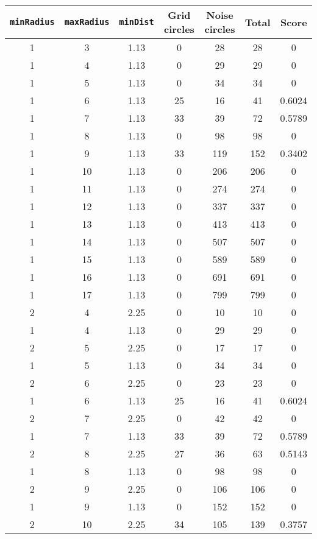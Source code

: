 \documentclass[letterpaper, 12pt]{article}
\begin{document}
\begin{longtable}{|c|c|c|c|c|c|c|}
\hline
\textbf{\texttt{minRadius}} & \textbf{\texttt{maxRadius}} & \textbf{\texttt{minDist}} & \textbf{Grid circles} & \textbf{Noise circles} & \textbf{Total} & \textbf{Score} \\
\hline
1 & 3 & 1.13 & 0 & 28 & 28 & 0 \\
\hline
1 & 4 & 1.13 & 0 & 29 & 29 & 0 \\
\hline
1 & 5 & 1.13 & 0 & 34 & 34 & 0 \\
\hline
1 & 6 & 1.13 & 25 & 16 & 41 & 0.6024 \\
\hline
1 & 7 & 1.13 & 33 & 39 & 72 & 0.5789 \\
\hline
1 & 8 & 1.13 & 0 & 98 & 98 & 0 \\
\hline
1 & 9 & 1.13 & 33 & 119 & 152 & 0.3402 \\
\hline
1 & 10 & 1.13 & 0 & 206 & 206 & 0 \\
\hline
1 & 11 & 1.13 & 0 & 274 & 274 & 0 \\
\hline
1 & 12 & 1.13 & 0 & 337 & 337 & 0 \\
\hline
1 & 13 & 1.13 & 0 & 413 & 413 & 0 \\
\hline
1 & 14 & 1.13 & 0 & 507 & 507 & 0 \\
\hline
1 & 15 & 1.13 & 0 & 589 & 589 & 0 \\
\hline
1 & 16 & 1.13 & 0 & 691 & 691 & 0 \\
\hline
1 & 17 & 1.13 & 0 & 799 & 799 & 0 \\
\hline
2 & 4 & 2.25 & 0 & 10 & 10 & 0 \\
\hline
1 & 4 & 1.13 & 0 & 29 & 29 & 0 \\
\hline
2 & 5 & 2.25 & 0 & 17 & 17 & 0 \\
\hline
1 & 5 & 1.13 & 0 & 34 & 34 & 0 \\
\hline
2 & 6 & 2.25 & 0 & 23 & 23 & 0 \\
\hline
1 & 6 & 1.13 & 25 & 16 & 41 & 0.6024 \\
\hline
2 & 7 & 2.25 & 0 & 42 & 42 & 0 \\
\hline
1 & 7 & 1.13 & 33 & 39 & 72 & 0.5789 \\
\hline
2 & 8 & 2.25 & 27 & 36 & 63 & 0.5143 \\
\hline
1 & 8 & 1.13 & 0 & 98 & 98 & 0 \\
\hline
2 & 9 & 2.25 & 0 & 106 & 106 & 0 \\
\hline
1 & 9 & 1.13 & 0 & 152 & 152 & 0 \\
\hline
2 & 10 & 2.25 & 34 & 105 & 139 & 0.3757 \\

\end{longtable}
\end{document}
